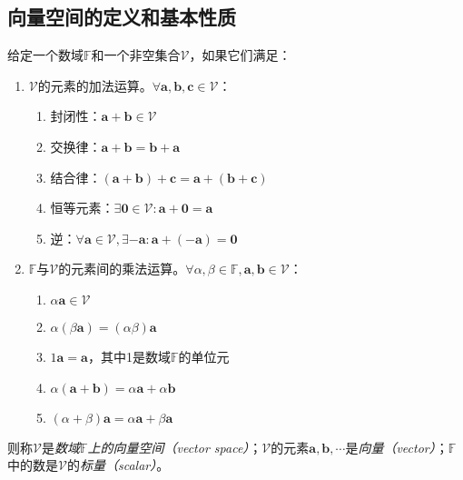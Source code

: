 \documentclass[../main.tex]{subfiles}
\begin{document}
\subsection{向量空间的定义和基本性质}
\begin{definition}[向量空间]\label{def:II.2.1}
    给定一个数域$\mathbb{F}$和一个非空集合$\mathcal{V}$，如果它们满足：
    \begin{enumerate}
        \item $\mathcal{V}$的元素的加法运算。$\forall\mathbf{a},\mathbf{b},\mathbf{c}\in \mathcal{V}$：
              \begin{enumerate}
                  \item 封闭性：$\mathbf{a}+\mathbf{b}\in\mathcal{V}$
                  \item 交换律：$\mathbf{a}+\mathbf{b}=\mathbf{b}+\mathbf{a}$
                  \item 结合律：$\left(\mathbf{a}+\mathbf{b}\right)+\mathbf{c}=\mathbf{a}+\left(\mathbf{b}+\mathbf{c}\right)$
                  \item 恒等元素：$\exists \bm{0}\in\mathcal{V}:\mathbf{a}+\bm{0}=\mathbf{a}$
                  \item 逆：$\forall \mathbf{a}\in\mathcal{V},\exists -\mathbf{a}:\mathbf{a}+\left(-\mathbf{a}\right)=\bm{0}$
              \end{enumerate}
        \item $\mathbb{F}$与$\mathcal{V}$的元素间的乘法运算。$\forall\alpha,\beta\in\mathbb{F},\mathbf{a},\mathbf{b}\in\mathcal{V}$：
              \begin{enumerate}
                  \item $\alpha\mathbf{a}\in\mathcal{V}$
                  \item $\alpha\left(\beta\mathbf{a}\right)=\left(\alpha\beta\right)\mathbf{a}$
                  \item $1\mathbf{a}=\mathbf{a}$，其中1是数域$\mathbb{F}$的单位元
                  \item $\alpha\left(\mathbf{a}+\mathbf{b}\right)=\alpha\mathbf{a}+\alpha\mathbf{b}$
                  \item $\left(\alpha+\beta\right)\mathbf{a}=\alpha\mathbf{a}+\beta\mathbf{a}$
              \end{enumerate}
    \end{enumerate}
    则称$\mathcal{V}$是\emph{数域$\mathbb{F}$上的向量空间（vector space）}；$\mathcal{V}$的元素$\mathbf{a},\mathbf{b},\cdots$是\emph{向量（vector）}；$\mathbb{F}$中的数是$\mathcal{V}$的\emph{标量（scalar）}。
\end{definition}
\end{document}
